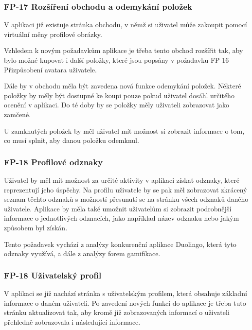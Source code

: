 \subsubsection{FP-17 Rozšíření obchodu a odemykání položek}

V aplikaci již existuje stránka obchodu, v němž si uživatel může zakoupit pomocí virtuální měny profilové obrázky.

Vzhledem k novým požadavkům aplikace je třeba tento obchod rozšířit tak, aby bylo možné kupovat i další položky, které jsou popsány v požadavku FP-16 Přizpůsobení avatara uživatele. %

Dále by v obchodu měla být zavedena nová funkce odemykání položek. Některé položky by měly být dostupné ke koupi pouze pokud uživatel dosáhl určitého ocenění v aplikaci. Do té doby by se položky měly uživateli zobrazovat jako zamčené.

U zamknutých položek by měl uživatel mít možnost si zobrazit informace o tom, co musí splnit, aby danou položku odemknul.


\subsubsection{FP-18 Profilové odznaky}

Uživatel by měl mít možnost za určité aktivity v aplikaci získat odznaky, které reprezentují jeho úspěchy. Na profilu uživatele by se pak měl zobrazovat zkrácený seznam těchto odznaků s možností přesunutí se na stránku všech odznaků daného uživatele. Aplikace by měla také umožnit uživatelům si zobrazit podrobnější informace o jednotlivých odznacích, jako například název odznaku nebo jakým způsobem byl získán.

Tento požadavek vychází z analýzy konkurenční aplikace Duolingo, která tyto odznaky využívá, a dále z analýzy forem gamifikace.

\subsubsection{FP-18 Uživatelský profil}

V aplikaci se již nachází stránka s uživatelským profilem, která obsahuje základní informace o daném uživateli. Po zavedení nových funkcí do aplikace je třeba tuto stránku aktualizovat tak, aby kromě již zobrazovaných informací o uživateli přehledně zobrazovala i následující informace.

